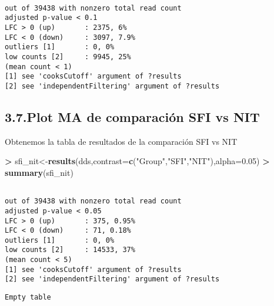 \documentclass[
]{article}
\newenvironment{Shaded}{\begin{snugshade}}{\end{snugshade}}
\newcommand{\DataTypeTok}[1]{\textcolor[rgb]{0.13,0.29,0.53}{#1}}
\newcommand{\FloatTok}[1]{\textcolor[rgb]{0.00,0.00,0.81}{#1}}
\newcommand{\KeywordTok}[1]{\textcolor[rgb]{0.13,0.29,0.53}{\textbf{#1}}}
\newcommand{\NormalTok}[1]{#1}
\newcommand{\OperatorTok}[1]{\textcolor[rgb]{0.81,0.36,0.00}{\textbf{#1}}}
\newcommand{\StringTok}[1]{\textcolor[rgb]{0.31,0.60,0.02}{#1}}
\begin{document}
\begin{verbatim}

out of 39438 with nonzero total read count
adjusted p-value < 0.1
LFC > 0 (up)       : 2375, 6%
LFC < 0 (down)     : 3097, 7.9%
outliers [1]       : 0, 0%
low counts [2]     : 9945, 25%
(mean count < 1)
[1] see 'cooksCutoff' argument of ?results
[2] see 'independentFiltering' argument of ?results
\end{verbatim}

\hypertarget{plot-ma-de-comparaciuxf3n-sfi-vs-nit}{%
\subsection{3.7.Plot MA de comparación SFI vs
NIT}\label{plot-ma-de-comparaciuxf3n-sfi-vs-nit}}

Obtenemos la tabla de resultados de la comparación SFI vs NIT

\begin{Shaded}
\begin{Highlighting}[]
\OperatorTok{>}\StringTok{ }\NormalTok{sfi_nit<-}\KeywordTok{results}\NormalTok{(dds,}\DataTypeTok{contrast=}\KeywordTok{c}\NormalTok{(}\StringTok{"Group"}\NormalTok{,}\StringTok{"SFI"}\NormalTok{,}\StringTok{"NIT"}\NormalTok{),}\DataTypeTok{alpha=}\FloatTok{0.05}\NormalTok{)}
\OperatorTok{>}\StringTok{ }\KeywordTok{summary}\NormalTok{(sfi_nit)}
\end{Highlighting}
\end{Shaded}

\begin{verbatim}

out of 39438 with nonzero total read count
adjusted p-value < 0.05
LFC > 0 (up)       : 375, 0.95%
LFC < 0 (down)     : 71, 0.18%
outliers [1]       : 0, 0%
low counts [2]     : 14533, 37%
(mean count < 5)
[1] see 'cooksCutoff' argument of ?results
[2] see 'independentFiltering' argument of ?results
\end{verbatim}

\begin{Shaded}
\end{Shaded}

\begin{verbatim}
Empty table
\end{verbatim}
\end{document}
